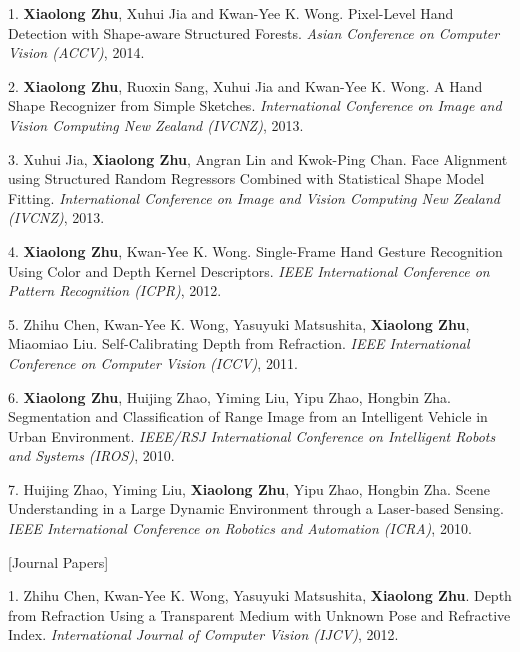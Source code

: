 \documentclass[10pt]{article}
\makeatletter
\newlength{\bibhang}
\newlength{\bibsep}
 {\@listi \global\bibsep\itemsep \global\advance\bibsep by\parsep}
\newenvironment{bibsection}%
        {\vspace{\itemsep}\begin{list}{}{%
       \setlength{\leftmargin}{\bibhang}%
       \setlength{\itemsep}{\bibsep}%
       \setlength{\parsep}{\z@}%
        \setlength{\partopsep}{0pt}%
        \setlength{\topsep}{0pt}}}
        {\end{list}\vspace{\itemsep}}
\makeatother
\begin{document}
\begin{bibsection}
	\item[1.] \textbf{Xiaolong Zhu}, Xuhui Jia and Kwan-Yee K. Wong. Pixel-Level Hand Detection with Shape-aware Structured Forests. \emph{Asian Conference on Computer Vision (ACCV)}, 2014.
	
    \item[2.] \textbf{Xiaolong Zhu}, Ruoxin Sang, Xuhui Jia and Kwan-Yee K. Wong. A Hand Shape Recognizer from Simple Sketches. \emph{International Conference on Image and Vision Computing New Zealand (IVCNZ)}, 2013.

    \item[3.] Xuhui Jia, \textbf{Xiaolong Zhu}, Angran Lin and Kwok-Ping Chan. Face Alignment using Structured Random Regressors Combined with Statistical Shape Model Fitting. \emph{International Conference on Image and Vision Computing New Zealand (IVCNZ)}, 2013.

    \item[4.] \textbf{Xiaolong Zhu}, Kwan-Yee K. Wong. Single-Frame Hand Gesture Recognition Using Color and Depth Kernel Descriptors. \emph{IEEE International Conference on Pattern Recognition (ICPR)}, 2012.

    \item[5.] Zhihu Chen, Kwan-Yee K. Wong, Yasuyuki Matsushita, \textbf{Xiaolong Zhu}, Miaomiao Liu. Self-Calibrating Depth from Refraction. \emph{IEEE International Conference on Computer Vision (ICCV)}, 2011.

    \item[6.] \textbf{Xiaolong Zhu}, Huijing Zhao, Yiming Liu, Yipu Zhao, Hongbin Zha. Segmentation and Classification of Range Image from an Intelligent Vehicle in Urban Environment. \emph{IEEE/RSJ International Conference on Intelligent Robots and Systems (IROS)}, 2010.

    \item[7.] Huijing Zhao, Yiming Liu,\textbf{ Xiaolong Zhu}, Yipu Zhao, Hongbin Zha. Scene Understanding in a Large Dynamic Environment through a Laser-based Sensing. \emph{IEEE International Conference on Robotics and Automation (ICRA)}, 2010.
\end{bibsection}

[Journal Papers]

\begin{bibsection}

    \item[1.] Zhihu Chen, Kwan-Yee K. Wong, Yasuyuki Matsushita, \textbf{Xiaolong Zhu}. Depth from Refraction Using a Transparent Medium with Unknown Pose and Refractive Index. \emph{International Journal of Computer Vision (IJCV)}, 2012.

\end{bibsection}
\end{document}
